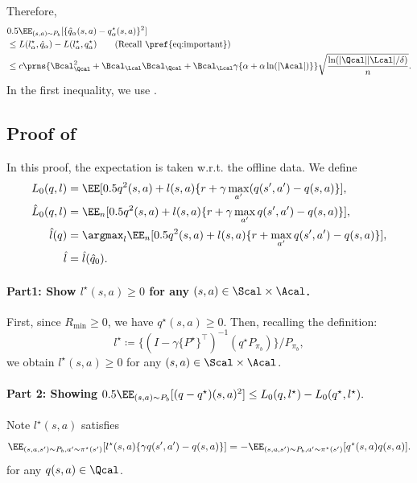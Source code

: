 Therefore, 
\begin{align*}
& 0.5\EE_{(s,a) \sim P_b}[\{\hat q_{\alpha}(s,a)-q^{\star}_{\alpha}(s,a) \}^2] \\
&\leq L(l^{\star}_{\alpha},\hat q_{\alpha})-L(l^{\star}_{\alpha},q^{\star}_{\alpha})  \tag{Recall \pref{eq:important}}\\
& \leq c \prns{  \Bcal^2_{\Qcal}+ \Bcal_{\Lcal}\Bcal_{\Qcal}+ \Bcal_{\Lcal}\gamma \{\alpha+\alpha  \ln(|\Acal|)\}} \sqrt{\frac{\ln(|\Qcal||\Lcal|/\delta)}{n}}. 
\end{align*}
In the first inequality, we use . 

\subsection{Proof of }

In this proof, the expectation is taken w.r.t. the offline data. We define 
\begin{align*}
    L_0(q,l) &= \EE[0.5 q^2(s,a)+ l(s,a)\{r+\gamma \max_{a'}(q(s',a')- q(s,a)\}], \\  
\hat L_0(q,l) &= \EE_n[0.5 q^2(s,a)+ l(s,a)\{r+\gamma \max_{a'} q(s',a') -q(s,a)\}], \\
\hat l(q) &= \argmax_{l}\EE_n[0.5 q^2(s,a)+ l(s,a)\{r+\max_{a'}q(s',a')-q(s,a)\}],\\
\hat l &= \hat l(\hat q_0). 
\end{align*}

\paragraph{Part1: Show $l^{\star}(s,a)\geq 0$ for any $(s,a) \in \Scal \times \Acal$.}

First, since $R_{\min}\geq 0$, we have $q^{\star}(s,a)\geq 0$. Then, recalling the definition:
$$l^{\star} \coloneqq \{(I-\gamma \{P^{\star}\}^{\top})^{-1 }(q^{\star}P_{\pi_b})\}/P_{\pi_b},$$ 
we obtain $l^{\star}(s,a)\geq 0$ for any $(s,a) \in \Scal \times \Acal$. 

\paragraph{Part 2: Showing $ 0.5\EE_{(s,a)\sim P_b}[(q-q^{\star})(s,a)^2]\leq L_0(q,l^{\star})-L_0(q^{\star},l^{\star}). $ } 

Note $l^{\star}(s,a)$ satisfies 
\begin{align}\label{eq:adjoint2}
 \EE_{(s,a,s')\sim P_b,a'\sim \pi^{\star}(s
')}[l^{\star}(s,a)\{\gamma q(s',a')-q(s,a) \} ]= -\EE_{(s,a,s')\sim P_b,a'\sim \pi^{\star}(s
')}[q^{\star}(s,a)q(s,a) ]. 
\end{align}
for any $q(s,a) \in \Qcal$. 

